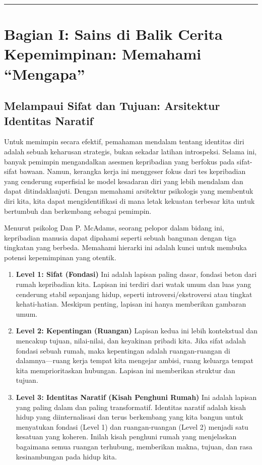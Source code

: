 \documentclass[
  letterpaper,
  DIV=11,
  numbers=noendperiod]{scrreprt}
\begin{document}
\begin{center}\rule{0.5\linewidth}{0.5pt}\end{center}

\section{Bagian I: Sains di Balik Cerita Kepemimpinan: Memahami
``Mengapa''}\label{bagian-i-sains-di-balik-cerita-kepemimpinan-memahami-mengapa}

\subsection{Melampaui Sifat dan Tujuan: Arsitektur Identitas
Naratif}\label{melampaui-sifat-dan-tujuan-arsitektur-identitas-naratif}

Untuk memimpin secara efektif, pemahaman mendalam tentang identitas diri
adalah sebuah keharusan strategis, bukan sekadar latihan introspeksi.
Selama ini, banyak pemimpin mengandalkan asesmen kepribadian yang
berfokus pada sifat-sifat bawaan. Namun, kerangka kerja ini menggeser
fokus dari tes kepribadian yang cenderung superfisial ke model kesadaran
diri yang lebih mendalam dan dapat ditindaklanjuti. Dengan memahami
arsitektur psikologis yang membentuk diri kita, kita dapat
mengidentifikasi di mana letak kekuatan terbesar kita untuk bertumbuh
dan berkembang sebagai pemimpin.

Menurut psikolog Dan P. McAdams, seorang pelopor dalam bidang ini,
kepribadian manusia dapat dipahami seperti sebuah bangunan dengan tiga
tingkatan yang berbeda. Memahami hierarki ini adalah kunci untuk membuka
potensi kepemimpinan yang otentik.

\begin{enumerate}
\def\labelenumi{\arabic{enumi}.}
\item
  \textbf{Level 1: Sifat (Fondasi)} Ini adalah lapisan paling dasar,
  fondasi beton dari rumah kepribadian kita. Lapisan ini terdiri dari
  watak umum dan luas yang cenderung stabil sepanjang hidup, seperti
  introversi/ekstroversi atau tingkat kehati-hatian. Meskipun penting,
  lapisan ini hanya memberikan gambaran umum.
\item
  \textbf{Level 2: Kepentingan (Ruangan)} Lapisan kedua ini lebih
  kontekstual dan mencakup tujuan, nilai-nilai, dan keyakinan pribadi
  kita. Jika sifat adalah fondasi sebuah rumah, maka kepentingan adalah
  ruangan-ruangan di dalamnya---ruang kerja tempat kita mengejar ambisi,
  ruang keluarga tempat kita memprioritaskan hubungan. Lapisan ini
  memberikan struktur dan tujuan.
\item
  \textbf{Level 3: Identitas Naratif (Kisah Penghuni Rumah)} Ini adalah
  lapisan yang paling dalam dan paling transformatif. Identitas naratif
  adalah kisah hidup yang diinternalisasi dan terus berkembang yang kita
  bangun untuk menyatukan fondasi (Level 1) dan ruangan-ruangan (Level
  2) menjadi satu kesatuan yang koheren. Inilah kisah penghuni rumah
  yang menjelaskan bagaimana semua ruangan terhubung, memberikan makna,
  tujuan, dan rasa kesinambungan pada hidup kita.
\end{enumerate}
\end{document}
